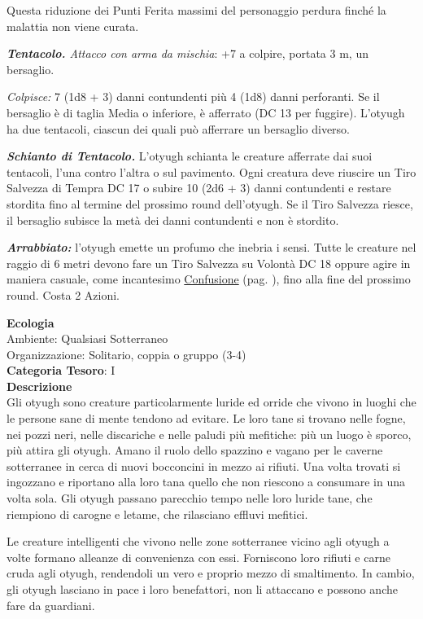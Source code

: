 \begin{multicols}{2}
{Questa riduzione dei Punti Ferita massimi del personaggio perdura finché la malattia non viene curata.

\emph{\textbf{Tentacolo.} Attacco con arma da mischia}: +7 a colpire, portata 3 m, un bersaglio.

\emph{Colpisce:} 7 (1d8 + 3) danni contundenti più 4 (1d8) danni perforanti. Se il bersaglio è di taglia Media o inferiore, è afferrato (DC 13 per fuggire). L'otyugh ha due tentacoli, ciascun dei quali può afferrare un bersaglio diverso.

\emph{\textbf{Schianto di Tentacolo.}} L'otyugh schianta le creature afferrate dai suoi tentacoli, l'una contro l'altra o sul pavimento. Ogni creatura deve riuscire un Tiro Salvezza di Tempra DC 17 o subire 10 (2d6 + 3) danni contundenti e restare stordita fino al termine del prossimo round dell'otyugh. Se il Tiro Salvezza riesce, il bersaglio subisce la metà dei danni contundenti e non è stordito.

\emph{\textbf{Arrabbiato:}} l'otyugh emette un profumo che inebria i sensi. Tutte le creature nel raggio di 6 metri devono fare un Tiro Salvezza su Volontà DC 18 oppure agire in maniera casuale, come incantesimo \hyperlink{incconfusione}{Confusione} (pag. \pageref{incconfusione}), fino alla fine del prossimo round. Costa 2 Azioni.

\textbf{Ecologia}\\
Ambiente: Qualsiasi Sotterraneo\\
Organizzazione: Solitario, coppia o gruppo (3-4)\\
\textbf{Categoria Tesoro}: I\\
\textbf{Descrizione}\\
Gli otyugh sono creature particolarmente luride ed orride che vivono in luoghi che le persone sane di mente tendono ad evitare. Le loro tane si trovano nelle fogne, nei pozzi neri, nelle discariche e nelle paludi più mefitiche: più un luogo è sporco, più attira gli otyugh. Amano il ruolo dello spazzino e vagano per le caverne sotterranee in cerca di nuovi bocconcini in mezzo ai rifiuti. Una volta trovati si ingozzano e riportano alla loro tana quello che non riescono a consumare in una volta sola. Gli otyugh passano parecchio tempo nelle loro luride tane, che riempiono di carogne e letame, che rilasciano effluvi mefitici.

Le creature intelligenti che vivono nelle zone sotterranee vicino agli otyugh a volte formano alleanze di convenienza con essi. Forniscono loro rifiuti e carne cruda agli otyugh, rendendoli un vero e proprio mezzo di smaltimento. In cambio, gli otyugh lasciano in pace i loro benefattori, non li attaccano e possono anche fare da guardiani.

}
\end{multicols}

